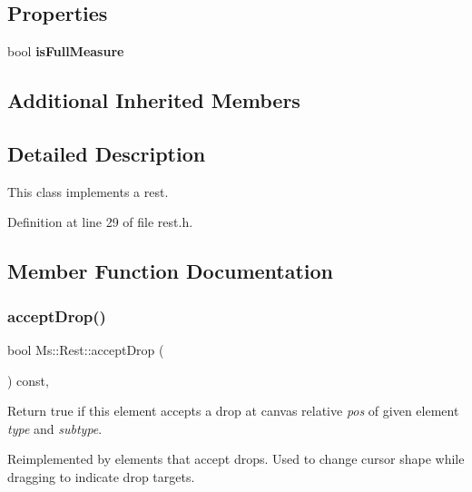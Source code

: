 \subsection*{Properties}
\begin{DoxyCompactItemize}
\item 
\mbox{\label{class_ms_1_1_rest_ade02322f72a9e6dffb52bed921c5e6ce}} 
bool {\bfseries is\+Full\+Measure}
\end{DoxyCompactItemize}
\subsection*{Additional Inherited Members}


\subsection{Detailed Description}
This class implements a rest. 

Definition at line 29 of file rest.\+h.



\subsection{Member Function Documentation}
\mbox{\label{class_ms_1_1_rest_a0b2f2d3aec34bcd9ce047b60577d12df}} 
\subsubsection{\texorpdfstring{accept\+Drop()}{acceptDrop()}}
{\footnotesize\ttfamily bool Ms\+::\+Rest\+::accept\+Drop (\begin{DoxyParamCaption}\item[{\hyperlink{class_ms_1_1_edit_data}{Edit\+Data} \&}]{ }\end{DoxyParamCaption}) const\hspace{0.3cm}{\ttfamily [override]}, {\ttfamily [virtual]}}

Return true if this element accepts a drop at canvas relative {\itshape pos} of given element {\itshape type} and {\itshape subtype}.

Reimplemented by elements that accept drops. Used to change cursor shape while dragging to indicate drop targets. 

